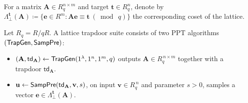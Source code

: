 For a matrix $\mathbf{A}\in R_q^{n\times m}$ and target $\mathbf{t}\in R_q^{n}$, denote by
$\Lambda^\mathbf{t}_\perp(\mathbf{A}) \coloneqq \{\mathbf{e}\in R^m : \mathbf{A}\mathbf{e}\equiv \mathbf{t}\ (\bmod\ q)\}$ the corresponding coset of the lattice.


\begin{definition}\label{def:trapdoor}
Let $R_q=R/qR$. A lattice trapdoor suite consists of two PPT algorithms $(\mathsf{TrapGen},\mathsf{SampPre})$:
\begin{itemize}[leftmargin=1.25em]
  \item $(\mathbf{A},\mathsf{td}_\mathbf{A})\leftarrow \mathsf{TrapGen}(1^\lambda,1^n,1^m,q)$ outputs $\mathbf{A}\in R_q^{\,n\times m}$  together with a trapdoor $\mathsf{td}_\mathbf{A}$.
  \item $\mathbf{u}\leftarrow \mathsf{SampPre}(\mathsf{td}_\mathbf{A},\mathbf{v},s)$, on input $\mathbf{v}\in R_q^{\,n}$ and 
  parameter $s>0$, samples a vector  $\mathbf{e}\in \Lambda^{\mathbf{t}}_{\perp}(\mathbf{A})$.
\end{itemize}

\end{definition}

